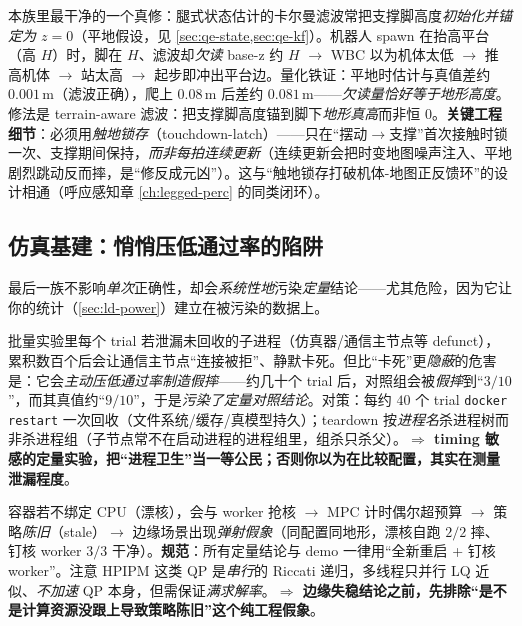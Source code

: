 \begin{insight}\label{ins:ld-kf-terrain}
本族里最干净的一个真修：腿式状态估计的卡尔曼滤波常把支撑脚高度\emph{初始化并锚定为 $z=0$}（平地假设，见 \cref{sec:qe-state,sec:qe-kf}）。机器人 spawn 在抬高平台（高 $H$）时，脚在 $H$、滤波却\emph{欠读} base-z 约 $H$ $\to$ WBC 以为机体太低 $\to$ 推高机体 $\to$ 站太高 $\to$ 起步即冲出平台边。量化铁证：平地时估计与真值差约 $0.001\,\mathrm{m}$（滤波正确），爬上 $0.08\,\mathrm{m}$ 后差约 $0.081\,\mathrm{m}$——\emph{欠读量恰好等于地形高度}。修法是 terrain-aware 滤波：把支撑脚高度锚到脚下\emph{地形真高}而非恒 $0$。\textbf{关键工程细节}：必须用\emph{触地锁存}（touchdown-latch）——只在“摆动$\to$支撑”首次接触时锁一次、支撑期间保持，\emph{而非每拍连续更新}（连续更新会把时变地图噪声注入、平地剧烈跳动反而摔，是“修反成元凶”）。这与“触地锁存打破机体-地图正反馈环”的设计相通（呼应感知章 \cref{ch:legged-perc} 的同类闭环）。
\end{insight}

\subsection{仿真基建：悄悄压低通过率的陷阱}
\label{subsec:ld-silent-infra}

最后一族不影响\emph{单次}正确性，却会\emph{系统性地}污染\emph{定量}结论——尤其危险，因为它让你的统计（\cref{sec:ld-power}）建立在被污染的数据上。

\begin{insight}\label{ins:ld-zombie}
批量实验里每个 trial 若泄漏未回收的子进程（仿真器/通信主节点等 defunct），累积数百个后会让通信主节点“连接被拒”、静默卡死。但比“卡死”更\emph{隐蔽}的危害是：它会\emph{主动压低通过率制造假摔}——约几十个 trial 后，对照组会被\emph{假摔}到“$3/10$”，而其真值约“$9/10$”，于是\emph{污染了定量对照结论}。对策：每约 $40$ 个 trial \texttt{docker restart} 一次回收（文件系统/缓存/真模型持久）；teardown 按\emph{进程名}杀进程树而非杀进程组（子节点常不在启动进程的进程组里，组杀只杀父）。\textbf{$\Rightarrow$ timing 敏感的定量实验，把“进程卫生”当一等公民；否则你以为在比较配置，其实在测量泄漏程度}。
\end{insight}

\begin{insight}[漂核 vs 钉核——抢核致策略陈旧的边缘弹射假象]\label{ins:ld-cpu-pin}
容器若不绑定 CPU（漂核），会与 worker 抢核 $\to$ MPC 计时偶尔超预算 $\to$ 策略\emph{陈旧}（stale）$\to$ 边缘场景出现\emph{弹射假象}（同配置同地形，漂核自跑 $2/2$ 摔、钉核 worker $3/3$ 干净）。\textbf{规范}：所有定量结论与 demo 一律用“全新重启 + 钉核 worker”。注意 HPIPM 这类 QP 是\emph{串行}的 Riccati 递归，多线程只并行 LQ 近似、\emph{不加速} QP 本身，但需保证\emph{满求解率}。\textbf{$\Rightarrow$ 边缘失稳结论之前，先排除“是不是计算资源没跟上导致策略陈旧”这个纯工程假象}。
\end{insight}

